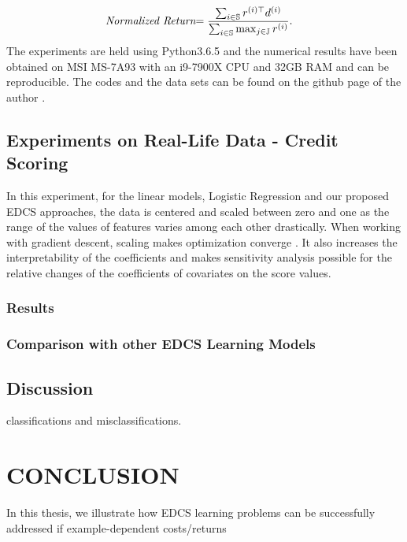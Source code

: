 \documentclass[a4paper,onesided,12pt]{report}
\begin{document}
\begin{equation}
{\label{eq:ScoreFunction}}
  \emph{Normalized Return} { = \dfrac{
  \sum_{i \in \mathbb{S}}r^{(i)\top} d^{(i)}}
  {\sum_{i \in \mathbb{S}} \max_{j \in \mathbb{J}} r^{(i)}}
  }. \quad 
\end{equation}
\indent The experiments are held using Python3.6.5 and the numerical results have been obtained on MSI MS-7A93 with an i9-7900X CPU and 32GB RAM and can be reproducible. The codes and the data sets can be found on the github page of the author \cite{tarkan2021}.

\section{Experiments on Real-Life Data - Credit Scoring}
\label{sec:experimentsreal}

In this experiment, for the linear models, Logistic Regression and our proposed EDCS approaches, the data is centered and scaled between zero and one as the range of the values of features varies among each other drastically. When working with gradient descent, scaling makes optimization converge \cite{LeCunBOM12}. It also increases the interpretability of the coefficients and makes sensitivity analysis possible for the relative changes of the coefficients of covariates on the score values. 

\subsection{Results}
\label{sec:bankresults}

\subsection{Comparison with other EDCS Learning Models}
\label{sec:bankresultscostcla}

\section{Discussion}
\label{sec:discussion}

classifications and misclassifications.

\chapter{CONCLUSION}
\label{sec:conclusion}

In this thesis, we illustrate how EDCS learning problems can be successfully addressed if example-dependent costs/returns
\end{document}
